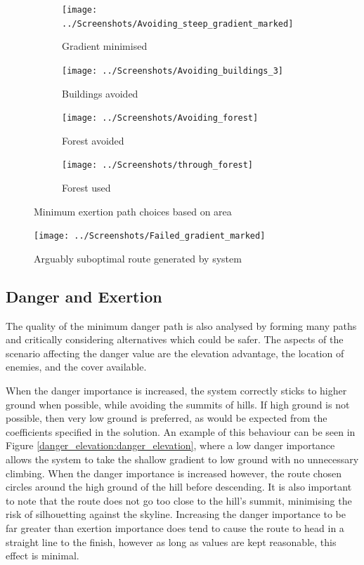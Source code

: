 \documentclass[12pt,a4paper]{article}
\begin{document}
  \begin{figure}[htb]
    \begin{subfigure}{.5\textwidth}
      \centering
        \texttt{[image: ../Screenshots/Avoiding\_steep\_gradient\_marked]}
        \caption{Gradient minimised}
        \label{min_exertion_avoidance:gradient}
    \end{subfigure}
    \begin{subfigure}{.5\textwidth}
      \centering
        \texttt{[image: ../Screenshots/Avoiding\_buildings\_3]}
        \caption{Buildings avoided}
        \label{min_exertion_avoidance:building}
    \end{subfigure}
    \begin{subfigure}{0.5\textwidth}
      \centering
      \texttt{[image: ../Screenshots/Avoiding\_forest]}
      \caption{Forest avoided}
      \label{min_exertion_avoidance:forest_avoid}
    \end{subfigure}
    \begin{subfigure}{0.5\textwidth}
      \centering
      \texttt{[image: ../Screenshots/through\_forest]}
      \caption{Forest used}
      \label{min_exertion_avoidance:forest_use}
    \end{subfigure}
    \caption{Minimum exertion path choices based on area}
    \label{min_exertion_avoidance:min_exertion_avoidance}
  \end{figure}

  \begin{figure}
    \centering
    \texttt{[image: ../Screenshots/Failed\_gradient\_marked]}
    \caption{Arguably suboptimal route generated by system}
    \label{failure}
  \end{figure}

  \subsection{Danger and Exertion}
  The quality of the minimum danger path is also analysed by forming many paths and critically considering alternatives which could be safer. The aspects of the scenario affecting the danger value are the elevation advantage, the location of enemies, and the cover available.
  \par When the danger importance is increased, the system correctly sticks to higher ground when possible, while avoiding the summits of hills. If high ground is not possible, then very low ground is preferred, as would be expected from the coefficients specified in the solution. An example of this behaviour can be seen in Figure \ref{danger_elevation:danger_elevation}, where a low danger importance allows the system to take the shallow gradient to low ground with no unnecessary climbing. When the danger importance is increased however, the route chosen circles around the high ground of the hill before descending. It is also important to note that the route does not go too close to the hill's summit, minimising the risk of silhouetting against the skyline. Increasing the danger importance to be far greater than exertion importance does tend to cause the route to head in a straight line to the finish, however as long as values are kept reasonable, this effect is minimal.
\end{document}

